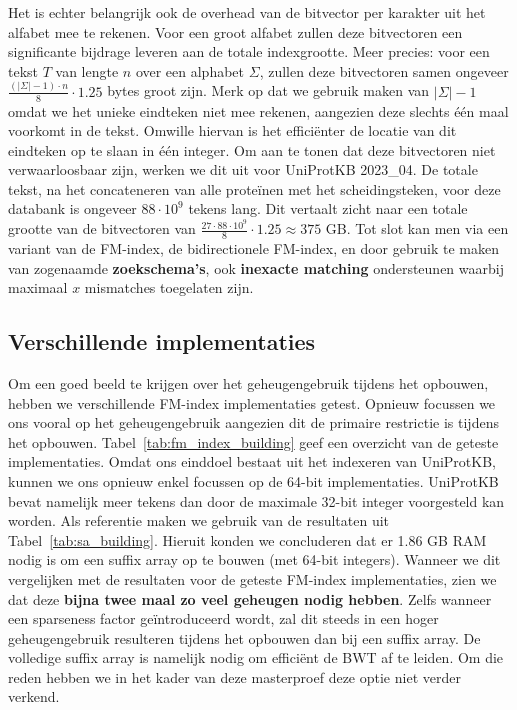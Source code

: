 Het is echter belangrijk ook de overhead van de bitvector per karakter uit het alfabet mee te rekenen.
Voor een groot alfabet zullen deze bitvectoren een significante bijdrage leveren aan de totale indexgrootte.
Meer precies: voor een tekst $T$ van lengte $n$ over een alphabet $\Sigma$, zullen deze bitvectoren samen ongeveer $\frac{(|\Sigma| - 1) \cdot n}{8} \cdot 1.25$ bytes groot zijn.
Merk op dat we gebruik maken van $|\Sigma| - 1$ omdat we het unieke eindteken niet mee rekenen, aangezien deze slechts één maal voorkomt in de tekst.
Omwille hiervan is het efficiënter de locatie van dit eindteken op te slaan in één integer.
Om aan te tonen dat deze bitvectoren niet verwaarloosbaar zijn, werken we dit uit voor UniProtKB 2023\_04.
De totale tekst, na het concateneren van alle proteïnen met het scheidingsteken, voor deze databank is ongeveer $88 \cdot 10^9$ tekens lang.
Dit vertaalt zicht naar een totale grootte van de bitvectoren van $\frac{27 \cdot 88 \cdot 10^9}{8} \cdot 1.25 \approx 375$ GB\@.
Tot slot kan men via een variant van de FM-index, de bidirectionele FM-index, en door gebruik te maken van zogenaamde \textbf{zoekschema's}, ook \textbf{inexacte matching} ondersteunen waarbij maximaal $x$ mismatches toegelaten zijn.

\subsection{Verschillende implementaties}\label{subsec:verschillende-implementaties}
Om een goed beeld te krijgen over het geheugengebruik tijdens het opbouwen, hebben we verschillende FM-index implementaties getest.
Opnieuw focussen we ons vooral op het geheugengebruik aangezien dit de primaire restrictie is tijdens het opbouwen.
Tabel~\ref{tab:fm_index_building} geef een overzicht van de geteste implementaties.
Omdat ons einddoel bestaat uit het indexeren van UniProtKB, kunnen we ons opnieuw enkel focussen op de 64-bit implementaties.
UniProtKB bevat namelijk meer tekens dan door de maximale 32-bit integer voorgesteld kan worden.
Als referentie maken we gebruik van de resultaten uit Tabel~\ref{tab:sa_building}.
Hieruit konden we concluderen dat er 1.86 GB RAM nodig is om een suffix array op te bouwen (met 64-bit integers).
Wanneer we dit vergelijken met de resultaten voor de geteste FM-index implementaties, zien we dat deze \textbf{bijna twee maal zo veel geheugen nodig hebben}.
Zelfs wanneer een sparseness factor geïntroduceerd wordt, zal dit steeds in een hoger geheugengebruik resulteren tijdens het opbouwen dan bij een suffix array.
De volledige suffix array is namelijk nodig om efficiënt de BWT af te leiden.
Om die reden hebben we in het kader van deze masterproef deze optie niet verder verkend.

